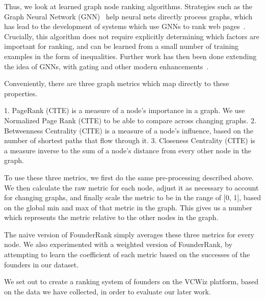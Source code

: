 Thus, we look at learned graph node ranking algorithms. Strategies such as the Graph Neural Network (GNN)~\cite{scarselli2009graph} help neural nets directly process graphs, which has lead to the development of systems which use GNNs to rank web pages~\cite{scarselli2005graph}. Crucially, this algorithm does not require explicitly determining which factors are important for ranking, and can be learned from a small number of training examples in the form of inequalities. Further work has then been done extending the idea of GNNs, with gating and other modern enhancements~\cite{DBLP:journals/corr/LiTBZ15}.


Conveniently, there are three graph metrics which map directly to these properties.

  1. PageRank (CITE) is a measure of a node's importance in a graph. We use Normalized Page Rank (CITE) to be able to compare across changing graphs.
  2. Betweenness Centrality (CITE) is a measure of a node's influence, based on the number of shortest paths that flow through it.
  3. Closeness Centrality (CITE) is a measure inverse to the sum of a node's distance from every other node in the graph.

To use these three metrics, we first do the same pre-processing described above. We then calculate the raw metric for each node, adjust it as necessary to account for changing graphs, and finally scale the metric to be in the range of [0, 1], based on the global min and max of that metric in the graph. This gives us a number which represents the metric relative to the other nodes in the graph.

The naive version of FounderRank simply averages these three metrics for every node. We also experimented with a weighted version of FounderRank, by attempting to learn the coefficient of each metric based on the successes of the founders in our dataset.

We set out to create a ranking system of founders on the VCWiz platform, based on the data we have collected, in order to evaluate our later work.

